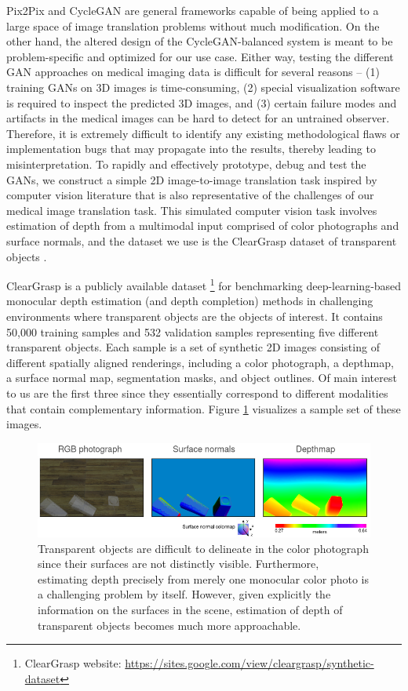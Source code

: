 Pix2Pix and CycleGAN are general frameworks capable of being applied to a large space of image translation problems without much modification. On the other hand, the altered design of the CycleGAN-balanced system is meant to be problem-specific and optimized for our use case. Either way, testing the different GAN approaches on medical imaging data is difficult for several reasons -- (1) training GANs on 3D images is time-consuming, (2) special visualization software is required to inspect the predicted 3D images, and (3) certain failure modes and artifacts in the medical images can be hard to detect for an untrained observer. Therefore, it is extremely difficult to identify any existing methodological flaws or implementation bugs that may propagate into the results, thereby leading to misinterpretation. To rapidly and effectively prototype, debug and test the GANs, we construct a simple 2D image-to-image translation task inspired by computer vision literature that is also representative of the challenges of our medical image translation task. This simulated computer vision task involves estimation of depth from a multimodal input comprised of color photographs and surface normals, and the dataset we use is the ClearGrasp dataset of transparent objects \cite{sajjan2020clear}.

ClearGrasp is a publicly available dataset \footnote{ClearGrasp website: \url{https://sites.google.com/view/cleargrasp/synthetic-dataset}} for benchmarking deep-learning-based monocular depth estimation (and depth completion) methods in challenging environments where transparent objects are the objects of interest. It contains 50,000 training samples and 532 validation samples representing five different transparent objects. Each sample is a set of synthetic 2D images consisting of different spatially aligned renderings, including a color photograph, a depthmap, a surface normal map, segmentation masks, and object outlines. Of main interest to us are the first three since they essentially correspond to different modalities that contain complementary information. Figure \ref{fig:cleargrasp_sample} visualizes a sample set of these images. 

\begin{figure}[h!]
    \centering
    \includegraphics[width=\linewidth]{figures/Cleargrasp_data/cleargrasp_sample.png}
    \caption{Transparent objects are difficult to delineate in the color photograph since their surfaces are not distinctly visible. Furthermore, estimating depth precisely from merely one monocular color photo is a challenging problem by itself. However, given explicitly the information on the surfaces in the scene, estimation of depth of transparent objects becomes much more approachable.}
    \label{fig:cleargrasp_sample}
\end{figure}{}

